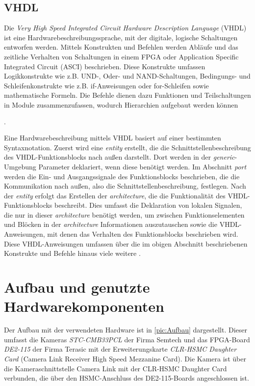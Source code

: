 \documentclass[ngerman,12pt]{article} %
\begin{document}
\subsection{VHDL} %
\label{sec:VHDL}
Die \textit{Very High Speed Integrated Circuit Hardware Description Language} (VHDL) ist eine Hardwarebeschreibungssprache, mit der digitale, logische Schaltungen entworfen werden. Mittels Konstrukten und Befehlen werden Abläufe und das zeitliche Verhalten von Schaltungen in einem FPGA oder Application Specific Integrated Circuit (ASCI) beschrieben. Diese Konstrukte umfassen Logikkonstrukte wie z.B. UND-, Oder- und NAND-Schaltungen, Bedingungs- und Schleifenkonstrukte wie z.B. if-Anweisungen oder for-Schleifen sowie mathematische Formeln. Die Befehle dienen dazu Funktionen und Teilschaltungen in Module zusammenzufassen, wodurch Hierarchien aufgebaut werden können {\cite{VHDL-mikrocontroller}.\newline

Eine Hardwarebeschreibung mittels VHDL basiert auf einer bestimmten Syntaxnotation. Zuerst wird eine \textit{entity} erstellt, die die Schnittstellenbeschreibung des VHDL-Funktionsblocks nach außen darstellt. Dort werden in der \textit{generic}-Umgebung Parameter deklariert, wenn diese benötigt werden. Im Abschnitt \textit{port} werden die Ein- und Ausgangssignale des Funktionsblocks beschrieben, die die Kommunikation nach außen, also die Schnittstellenbeschreibung, festlegen. Nach der \textit{entity} erfolgt das Erstellen der \textit{architecture}, die die Funktionalität des VHDL-Funktionsblocks beschreibt. Dies umfasst die Deklaration von lokalen Signalen, die nur in dieser \textit{architecture} benötigt werden, um zwischen Funktionselementen und Blöcken in der \textit{architecture} Informationen auszutauschen sowie die VHDL-Anweisungen, mit denen das Verhalten des Funktionsblocks beschrieben wird. Diese VHDL-Anweisungen umfassen über die im obigen Abschnitt beschriebenen Konstrukte und Befehle hinaus viele weitere \cite{Reichard VHDL}.\newline %
\clearpage





\section{Aufbau und genutzte Hardwarekomponenten}
\label{sec:Aufbau und Hardwarekomponenten}
Der Aufbau mit der verwendeten Hardware ist in \autoref{pic:Aufbau} dargestellt. Dieser umfasst die Kameras \textit{STC-CMB33PCL} der Firma Semtech und das FPGA-Board \textit{DE2-115} der Firma Terasic mit der Erweiterungskarte \textit{CLR-HSMC Daughter Card} (Camera Link Receiver High Speed Mezzanine Card).
Die Kamera ist über die Kameraschnittstelle Camera Link mit der CLR-HSMC Daughter Card verbunden, die über den HSMC-Anschluss des DE2-115-Boards angeschlossen ist.

}
\end{document}
